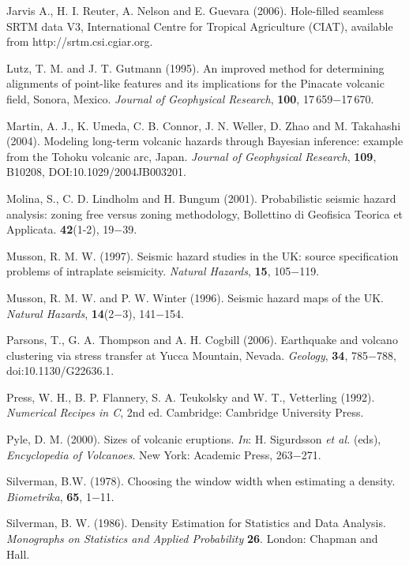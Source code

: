 \documentclass[10pt]{article}
\begin{document}
\begin{thebibliography}{99}
{
Jarvis A., H. I. Reuter, A. Nelson and E. Guevara (2006). Hole-filled seamless SRTM data V3, International Centre for Tropical Agriculture (CIAT), available from http://srtm.csi.cgiar.org.

Lutz, T. M. and J. T. Gutmann (1995). An improved method for determining alignments of point-like features and its implications for the Pinacate volcanic field, Sonora, Mexico. {\it Journal of Geophysical Research}, {\bf 100}, 17\,659$-$17\,670.

Martin, A. J., K. Umeda, C. B. Connor, J. N. Weller, D. Zhao and M. Takahashi (2004). Modeling long-term volcanic hazards through Bayesian inference: example from the Tohoku volcanic arc, Japan. {\it Journal of Geophysical Research}, {\bf 109}, B10208, DOI:10.1029/2004JB003201.

Molina, S., C. D. Lindholm and H. Bungum (2001). Probabilistic seismic hazard analysis: zoning free versus zoning methodology, Bollettino di Geofisica Teorica et Applicata. {\bf 42}(1-2), 19$-$39.

Musson, R. M. W. (1997). Seismic hazard studies in the UK: source specification problems of intraplate seismicity. {\it Natural Hazards}, {\bf 15}, 105$-$119.

Musson, R. M. W. and P. W. Winter  (1996). Seismic hazard maps of the UK. {\it Natural Hazards}, {\bf 14}(2$-$3), 141$-$154.

Parsons, T., G. A. Thompson and A. H. Cogbill (2006). Earthquake and volcano clustering via stress transfer at Yucca Mountain, Nevada. {\it Geology}, {\bf 34}, 785$-$788, doi:10.1130/G22636.1.

Press, W. H., B. P. Flannery, S. A. Teukolsky and W. T., Vetterling (1992). {\it Numerical Recipes in C}, 2nd ed. Cambridge: Cambridge University Press.

Pyle, D. M. (2000). Sizes of volcanic eruptions. {\it In}: H. Sigurdsson {\it et al.} (eds), {\it Encyclopedia of Volcanoes}. New York: Academic Press, 263$-$271.

Silverman, B.W. (1978). Choosing the window width when estimating a density. {\it Biometrika}, {\bf 65}, 1$-$11.

Silverman, B. W. (1986). Density Estimation for Statistics and Data Analysis. {\it Monographs on Statistics and Applied Probability} {\bf 26}. London: Chapman and Hall.

}
\end{thebibliography}
\end{document}
